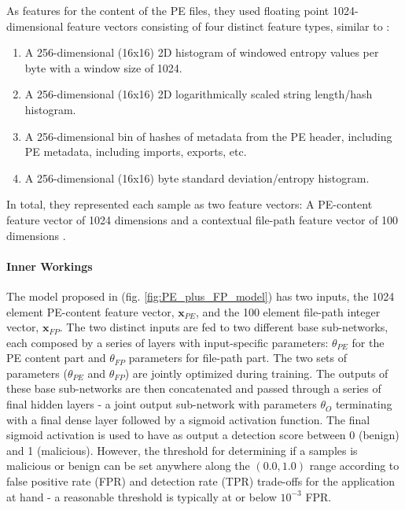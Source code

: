 \documentclass[pdfa%
,cucitura%
]{toptesi}
\begin{document}
As features for the content of the PE files, they used floating point 1024-dimensional feature vectors consisting of four distinct feature types, similar to \cite{saxeDNNBMDUTDBPF}:
\begin{enumerate}
	\item A 256-dimensional (16x16) 2D histogram of windowed entropy values per byte with a window size of 1024.
	
	\item A 256-dimensional (16x16) 2D logarithmically scaled string length/hash histogram.
	
	\item A 256-dimensional bin of hashes of metadata from the PE header, including PE metadata, including imports, exports, etc.
	
	\item A 256-dimensional (16x16) byte standard deviation/entropy histogram.
\end{enumerate}
In total, they represented each sample as two feature vectors: A PE-content feature vector of 1024 dimensions and a contextual file-path feature vector of 100 dimensions \cite{KyadigeLFCEIFPIBMD}.

\paragraph{Inner Workings}
The model proposed in \cite{KyadigeLFCEIFPIBMD} (fig. \ref{fig:PE_plus_FP_model}) has two inputs, the 1024 element PE-content feature vector, $\textbf{x}_{PE}$, and the 100 element file-path integer vector, $\textbf{x}_{FP}$. The two distinct inputs are fed to two different base sub-networks, each composed by a series of layers with input-specific parameters: $\theta_{PE}$ for the PE content part and $\theta_{FP}$ parameters for file-path part. The two sets of parameters ($\theta_{PE}$ and $\theta_{FP}$) are jointly optimized during training. The outputs of these base sub-networks are then concatenated and passed through a series of final hidden layers - a joint output sub-network with parameters $\theta_{O}$ terminating with a final dense layer followed by a sigmoid activation function. The final sigmoid activation is used to have as output a detection score between 0 (benign) and 1 (malicious). However, the threshold for determining if a samples is malicious or benign can be set anywhere along the $(0.0, 1.0)$ range according to false positive rate (FPR) and detection rate (TPR) trade-offs for the application at hand - a reasonable threshold is typically at or below $10^{-3}$ FPR.
\end{document}
